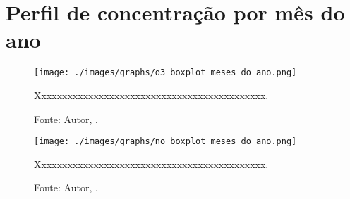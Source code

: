 


\lipsum[100]



\section{Perfil de concentração por mês do ano}



\lipsum[100]




\begin{figure}[H]
    \centering
    \texttt{[image: ./images/graphs/o3\_boxplot\_meses\_do\_ano.png]}
    \caption{Xxxxxxxxxxxxxxxxxxxxxxxxxxxxxxxxxxxxxxxxxxxx.}
    \label{fig:o3_boxplot_meses_do_ano.png}
    \caption*{Fonte: Autor, \imprimirdata.}
\end{figure}




\lipsum[100]




\begin{figure}[H]
    \centering
    \texttt{[image: ./images/graphs/no\_boxplot\_meses\_do\_ano.png]}
    \caption{Xxxxxxxxxxxxxxxxxxxxxxxxxxxxxxxxxxxxxxxxxxxx.}
    \label{fig:no_boxplot_meses_do_ano.png}
    \caption*{Fonte: Autor, \imprimirdata.}
\end{figure}

